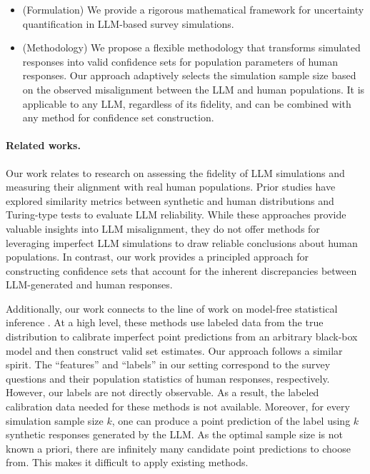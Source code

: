 \begin{itemize}
\item (Formulation) We provide a rigorous mathematical framework for uncertainty quantification in LLM-based survey simulations.

\item (Methodology) We propose a flexible methodology that transforms simulated responses into valid confidence sets for population parameters of human responses. Our approach adaptively selects the simulation sample size based on the observed misalignment between the LLM and human populations. It is applicable to any LLM, regardless of its fidelity, and can be combined with any method for confidence set construction.
\end{itemize}


\paragraph{Related works.} 

Our work relates to research on assessing the fidelity of LLM simulations and measuring their alignment with real human populations. Prior studies have explored similarity metrics between synthetic and human distributions \citep{SDL23, HMG24, DHM24, DNL24, CRD25} and Turing-type tests \citep{ABFG23, MXY24} to evaluate LLM reliability. While these approaches provide valuable insights into LLM misalignment, they do not offer methods for leveraging imperfect LLM simulations to draw reliable conclusions about human populations. In contrast, our work provides a principled approach for constructing confidence sets that account for the inherent discrepancies between LLM-generated and human responses.

Additionally, our work connects to the line of work on model-free statistical inference \citep{SVo08, BAL21, ABF23}. At a high level, these methods use labeled data from the true distribution to calibrate imperfect point predictions from an arbitrary black-box model and then construct valid set estimates.
Our approach follows a similar spirit. The ``features'' and ``labels'' in our setting correspond to the survey questions and their population statistics of human responses, respectively. 
However, our labels are not directly observable. As a result, the labeled calibration data needed for these methods is not available.
Moreover, for every simulation sample size $k$, one can produce a point prediction of the label using $k$ synthetic responses generated by the LLM. As the optimal sample size is not known a priori, there are infinitely many candidate point predictions to choose from. This makes it difficult to apply existing methods.

